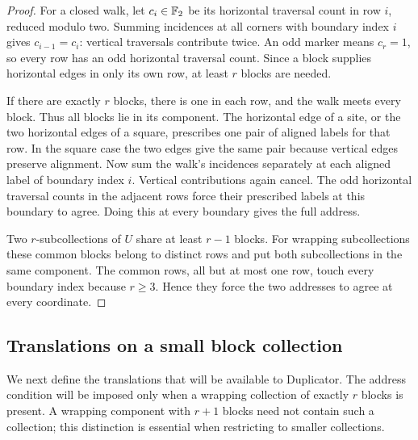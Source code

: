 \begin{proof}
For a closed walk, let $c_i\in\mathbb F_2$ be its horizontal traversal count
in row $i$, reduced modulo two. Summing incidences at all corners with
boundary index $i$ gives $c_{i-1}=c_i$: vertical traversals contribute
twice. An odd marker means $c_r=1$, so every row has an odd horizontal
traversal count. Since a block supplies horizontal edges in only its own
row, at least $r$ blocks are needed.

If there are exactly $r$ blocks, there is one in each row, and the walk
meets every block. Thus all blocks lie in its component. The horizontal
edge of a site, or the two horizontal edges of a square, prescribes one
pair of aligned labels for that row. In the square case the two edges
give the same pair because vertical edges preserve alignment. Now sum
the walk's incidences separately at each aligned label of boundary
index $i$. Vertical contributions again cancel. The odd horizontal
traversal counts in the adjacent rows force their prescribed labels at
this boundary to agree. Doing this at every boundary gives the full
address.

Two $r$-subcollections of $U$ share at least $r-1$ blocks. For wrapping
subcollections these common blocks belong to distinct rows and put both
subcollections in the same component. The common rows, all but at most
one row, touch every boundary index because $r\geq3$. Hence they force
the two addresses to agree at every coordinate.
\end{proof}

\subsection{Translations on a small block collection}

We next define the translations that will be available to Duplicator.
The address condition will be imposed only when a wrapping collection
of exactly $r$ blocks is present. A wrapping component with $r+1$
blocks need not contain such a collection; this distinction is essential
when restricting to smaller collections.

